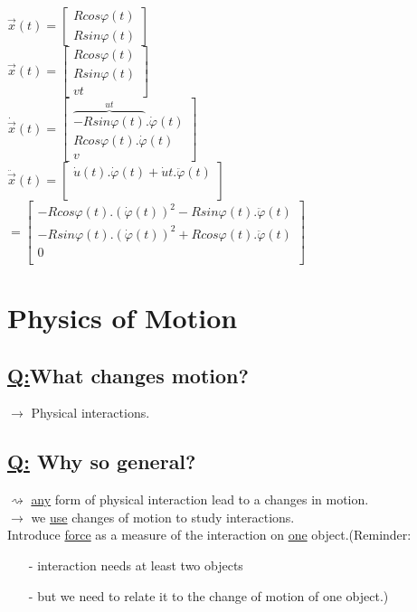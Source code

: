 \documentclass[a4paper, 12pt]{article}
\begin{document}
\begin{center}
$\vec{x}(t) = \begin{bmatrix}
R cos \varphi(t)\\
R sin \varphi(t)
\end{bmatrix}$\\$
\vec{x}(t) = \begin{bmatrix}
R cos \varphi(t)\\
R sin \varphi(t)\\
vt
\end{bmatrix}$\\$
\dot{\vec{x}}(t) = \begin{bmatrix}
\overset{ut}{\overbrace{-R sin \varphi(t)}}.\dot{\varphi}(t)\\
R cos \varphi(t).\dot{\varphi}(t)\\
v
\end{bmatrix}$\\$
\ddot{\vec{x}}(t) = \begin{bmatrix}
\dot{u}(t).\dot{\varphi}(t) + \dot{u}t.\ddot{\varphi}(t)\\
\\
\\
\end{bmatrix}$\\$
= \begin{bmatrix}
-R cos \varphi(t).(\dot{\varphi}(t))^2 - R sin \varphi(t).\ddot{\varphi}(t)\\
-R sin \varphi(t).(\dot{\varphi}(t))^2 + R cos \varphi(t).\ddot{\varphi}(t)\\
0\\
\end{bmatrix}$
\end{center}

\section{Physics of Motion}

\subsection{\underline{Q:}What changes motion?}
$\rightarrow$ Physical interactions.
\subsection{\underline{Q:} Why so general?}
$\rightsquigarrow$ \underline{any} form of physical interaction lead to a changes in motion.\\
$\rightarrow$ we \underline{use} changes of motion to study interactions.\\
Introduce \underline{force} as a measure of the interaction on \underline{one} object.(Reminder:
\begin{itemize}
\item[-] interaction needs at least two objects
\item[-] but we need to relate it to the change of motion of one object.)
\end{itemize}
\end{document}
